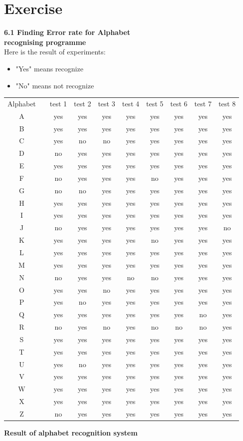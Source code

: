 \documentclass[11pt,a4paper]{article}
\begin{document}
	\section{Exercise}
	\textbf{\huge{6.1 Finding Error rate for Alphabet\\recognising programme}}
	\vspace{1cm}\\
	Here is the result of experiments:
	\begin{center}
    \begin{itemize}
        \item "Yes" means recognize
        \item "No" means not recognize
\end{itemize}
    \begin{tabular}{c|c|c|c|c|c|c|c|c|c}
    \hline
    	Alphabet&&test 1&test 2&test 3&test 4&test 5&test 6&test 7&test 8\\
         A& &yes&yes&yes&yes&yes&yes&yes&yes\\ 
         B& &yes&yes&yes&yes&yes&yes&yes&yes\\
         C& &yes&no&no&yes&yes&yes&yes&yes\\
         D& &no&yes&yes&yes&yes&yes&yes&yes\\
         E& &yes&yes&yes&yes&yes&yes&yes&yes\\
         F& &no&yes&yes&yes&no&yes&yes&yes\\
         G& &no&no&yes&yes&yes&yes&yes&yes\\
         H& &yes&yes&yes&yes&yes&yes&yes&yes\\
         I& &yes&yes&yes&yes&yes&yes&yes&yes\\
         J& &no&yes&yes&yes&yes&yes&yes&no\\
         K& &yes&yes&yes&yes&no&yes&yes&yes\\
         L& &yes&yes&yes&yes&yes&yes&yes&yes\\
         M& &yes&yes&yes&yes&yes&yes&yes&yes\\
         N& &no&yes&yes&no&no&yes&yes&yes\\
         O& &yes&yes&no&yes&yes&yes&yes&yes\\
         P& &yes&no&yes&yes&yes&yes&yes&yes\\
         Q& &yes&yes&yes&yes&yes&yes&no&yes\\
         R& &no&yes&no&yes&no&no&no&yes\\
         S& &yes&yes&yes&yes&yes&yes&yes&yes\\
         T& &yes&yes&yes&yes&yes&yes&yes&yes\\
         U& &yes&no&yes&yes&yes&yes&yes&yes\\
         V& &yes&yes&yes&yes&yes&yes&yes&yes\\
         W& &yes&yes&yes&yes&yes&yes&yes&yes\\
         X& &yes&yes&yes&yes&yes&yes&yes&yes\\
         Z& &no&yes&yes&yes&yes&yes&yes&yes\\
         
    \hline
    \end{tabular}
    \vspace{.1cm}
    \textbf {Result of alphabet recognition system}
    \end{center}
\end{document}
